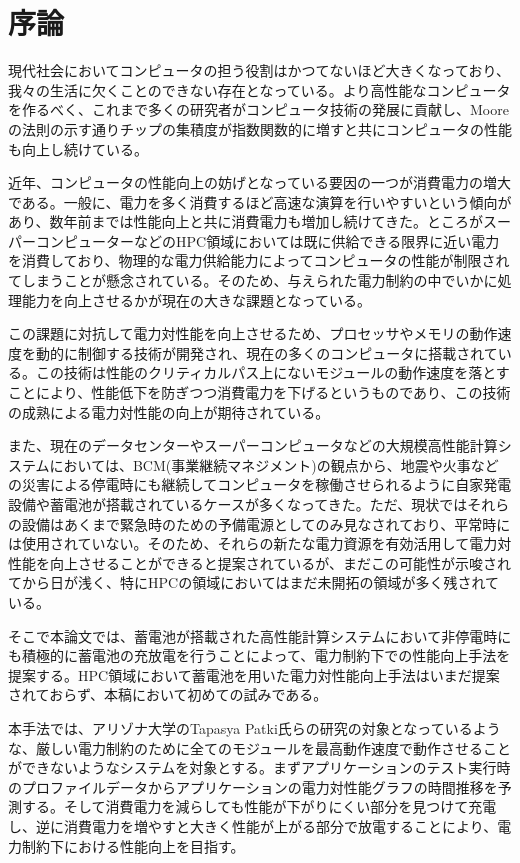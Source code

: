 \chapter{序論}

現代社会においてコンピュータの担う役割はかつてないほど大きくなっており、我々の生活に欠くことのできない存在となっている。より高性能なコンピュータを作るべく、これまで多くの研究者がコンピュータ技術の発展に貢献し、Mooreの法則\cite{mooreslaw}の示す通りチップの集積度が指数関数的に増すと共にコンピュータの性能も向上し続けている。

近年、コンピュータの性能向上の妨げとなっている要因の一つが消費電力の増大である。一般に、電力を多く消費するほど高速な演算を行いやすいという傾向があり、数年前までは性能向上と共に消費電力も増加し続けてきた。ところがスーパーコンピューターなどのHPC領域においては既に供給できる限界に近い電力を消費しており、物理的な電力供給能力によってコンピュータの性能が制限されてしまうことが懸念されている。そのため、与えられた電力制約の中でいかに処理能力を向上させるかが現在の大きな課題となっている。

この課題に対抗して電力対性能を向上させるため、プロセッサやメモリの動作速度を動的に制御する技術が開発され、現在の多くのコンピュータに搭載されている。この技術は性能のクリティカルパス上にないモジュールの動作速度を落とすことにより、性能低下を防ぎつつ消費電力を下げるというものであり、この技術の成熟による電力対性能の向上が期待されている。

また、現在のデータセンターやスーパーコンピュータなどの大規模高性能計算システムにおいては、BCM(事業継続マネジメント)の観点から、地震や火事などの災害による停電時にも継続してコンピュータを稼働させられるように自家発電設備や蓄電池が搭載されているケースが多くなってきた。ただ、現状ではそれらの設備はあくまで緊急時のための予備電源としてのみ見なされており、平常時には使用されていない。そのため、それらの新たな電力資源を有効活用して電力対性能を向上させることができると提案されている\cite{Govindan:2011:BLT:2024723.2000105}が、まだこの可能性が示唆されてから日が浅く、特にHPCの領域においてはまだ未開拓の領域が多く残されている。

そこで本論文では、蓄電池が搭載された高性能計算システムにおいて非停電時にも積極的に蓄電池の充放電を行うことによって、電力制約下での性能向上手法を提案する。HPC領域において蓄電池を用いた電力対性能向上手法はいまだ提案されておらず、本稿において初めての試みである。

本手法では、アリゾナ大学のTapasya Patki氏らの研究\cite{Patki:2013:EHO:2464996.2465009}の対象となっているような、厳しい電力制約のために全てのモジュールを最高動作速度で動作させることができないようなシステムを対象とする。まずアプリケーションのテスト実行時のプロファイルデータからアプリケーションの電力対性能グラフの時間推移を予測する。そして消費電力を減らしても性能が下がりにくい部分を見つけて充電し、逆に消費電力を増やすと大きく性能が上がる部分で放電することにより、電力制約下における性能向上を目指す。


